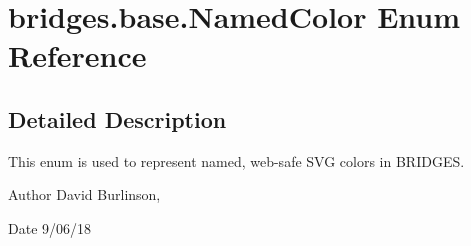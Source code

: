 \hypertarget{enumbridges_1_1base_1_1_named_color}{}\section{bridges.\+base.\+Named\+Color Enum Reference}
\label{enumbridges_1_1base_1_1_named_color}


\subsection{Detailed Description}
This enum is used to represent named, web-\/safe S\+VG colors in B\+R\+I\+D\+G\+ES. 

\begin{DoxyAuthor}{Author}
David Burlinson, 
\end{DoxyAuthor}
\begin{DoxyDate}{Date}
9/06/18 
\end{DoxyDate}

